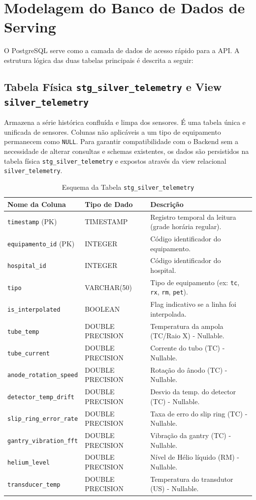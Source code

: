 \documentclass[12pt,a4paper]{article}
\begin{document}
\newpage

\section{Modelagem do Banco de Dados de Serving}

O PostgreSQL serve como a camada de dados de acesso rápido para a API. A estrutura lógica das duas tabelas principais é descrita a seguir:

\subsection{Tabela Física \texttt{stg\_silver\_telemetry} e View \texttt{silver\_telemetry}}
Armazena a série histórica confluída e limpa dos sensores. É uma tabela única e unificada de sensores. Colunas não aplicáveis a um tipo de equipamento permanecem como \texttt{NULL}. Para garantir compatibilidade com o Backend sem a necessidade de alterar consultas e schemas existentes, os dados são persistidos na tabela física \texttt{stg\_silver\_telemetry} e expostos através da view relacional \texttt{silver\_telemetry}.

\begin{table}[h]
\centering
\caption{Esquema da Tabela \texttt{stg\_silver\_telemetry}}
\begin{tabular}{lll}
\toprule
\textbf{Nome da Coluna} & \textbf{Tipo de Dado} & \textbf{Descrição} \\
\midrule
\texttt{timestamp} (PK) & TIMESTAMP & Registro temporal da leitura (grade horária regular). \\
\texttt{equipamento\_id} (PK) & INTEGER & Código identificador do equipamento. \\
\texttt{hospital\_id} & INTEGER & Código identificador do hospital. \\
\texttt{tipo} & VARCHAR(50) & Tipo de equipamento (ex: \texttt{tc}, \texttt{rx}, \texttt{rm}, \texttt{pet}). \\
\texttt{is\_interpolated} & BOOLEAN & Flag indicativo se a linha foi interpolada. \\
\texttt{tube\_temp} & DOUBLE PRECISION & Temperatura da ampola (TC/Raio X) - Nullable. \\
\texttt{tube\_current} & DOUBLE PRECISION & Corrente do tubo (TC) - Nullable. \\
\texttt{anode\_rotation\_speed} & DOUBLE PRECISION & Rotação do ânodo (TC) - Nullable. \\
\texttt{detector\_temp\_drift} & DOUBLE PRECISION & Desvio da temp. do detector (TC) - Nullable. \\
\texttt{slip\_ring\_error\_rate} & DOUBLE PRECISION & Taxa de erro do slip ring (TC) - Nullable. \\
\texttt{gantry\_vibration\_fft} & DOUBLE PRECISION & Vibração da gantry (TC) - Nullable. \\
\texttt{helium\_level} & DOUBLE PRECISION & Nível de Hélio líquido (RM) - Nullable. \\
\texttt{transducer\_temp} & DOUBLE PRECISION & Temperatura do transdutor (US) - Nullable. \\
\bottomrule
\end{tabular}
\end{table}
\end{document}

